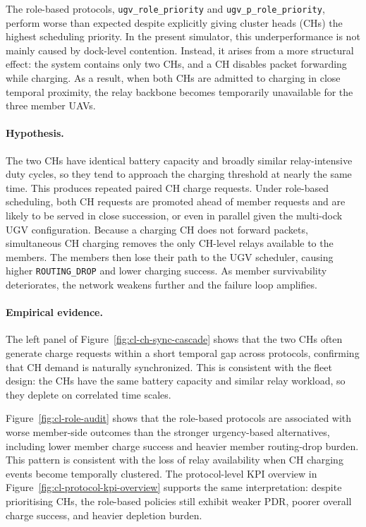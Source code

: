 The role-based protocols, \texttt{ugv\_role\_priority} and
\texttt{ugv\_p\_role\_priority}, perform worse than expected despite explicitly giving
cluster heads (CHs) the highest scheduling priority. In the present simulator, this
underperformance is not mainly caused by dock-level contention. Instead, it arises
from a more structural effect: the system contains only two CHs, and a CH disables
packet forwarding while charging. As a result, when both CHs are admitted to
charging in close temporal proximity, the relay backbone becomes temporarily
unavailable for the three member UAVs.

\paragraph{Hypothesis.}
The two CHs have identical battery capacity and broadly similar relay-intensive duty
cycles, so they tend to approach the charging threshold at nearly the same time.
This produces repeated paired CH charge requests. Under role-based scheduling,
both CH requests are promoted ahead of member requests and are likely to be served
in close succession, or even in parallel given the multi-dock UGV configuration.
Because a charging CH does not forward packets, simultaneous CH charging removes
the only CH-level relays available to the members. The members then lose their path
to the UGV scheduler, causing higher \texttt{ROUTING\_DROP} and lower charging
success. As member survivability deteriorates, the network weakens further and the
failure loop amplifies.

\paragraph{Empirical evidence.}
The left panel of Figure~\ref{fig:cl-ch-sync-cascade} shows that the two CHs often
generate charge requests within a short temporal gap across protocols, confirming
that CH demand is naturally synchronized. This is consistent with the fleet design:
the CHs have the same battery capacity and similar relay workload, so they deplete
on correlated time scales.

Figure~\ref{fig:cl-role-audit} shows that the role-based protocols are associated with
worse member-side outcomes than the stronger urgency-based alternatives,
including lower member charge success and heavier member routing-drop burden.
This pattern is consistent with the loss of relay availability when CH charging events
become temporally clustered. The protocol-level KPI overview in
Figure~\ref{fig:cl-protocol-kpi-overview} supports the same interpretation: despite
prioritising CHs, the role-based policies still exhibit weaker PDR, poorer overall
charge success, and heavier depletion burden.

